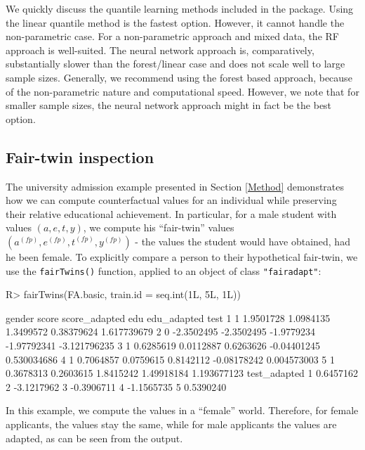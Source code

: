\documentclass[
  notitle]{jss}
\begin{document}
We quickly discuss the quantile learning methods included in the
package. Using the linear quantile method is the fastest option.
However, it cannot handle the non-parametric case. For a non-parametric
approach and mixed data, the RF approach is well-suited. The neural
network approach is, comparatively, substantially slower than the
forest/linear case and does not scale well to large sample sizes.
Generally, we recommend using the forest based approach, because of the
non-parametric nature and computational speed. However, we note that for
smaller sample sizes, the neural network approach might in fact be the
best option.

\hypertarget{fair-twin-inspection}{%
\subsection{Fair-twin inspection}\label{fair-twin-inspection}}

The university admission example presented in Section \ref{Method}
demonstrates how we can compute counterfactual values for an individual
while preserving their relative educational achievement. In particular,
for a male student with values \((a, e, t, y)\), we compute his
``fair-twin'' values
\(( {a}^{(fp)},  {e}^{(fp)},  {t}^{(fp)},  {y}^{(fp)})\) - the values
the student would have obtained, had he been female. To explicitly
compare a person to their hypothetical fair-twin, we use the
\texttt{fairTwins()} function, applied to an object of class
\texttt{"fairadapt"}:

\begin{CodeChunk}
\begin{CodeInput}
R> fairTwins(FA.basic, train.id = seq.int(1L, 5L, 1L))
\end{CodeInput}
\begin{CodeOutput}
  gender      score score_adapted        edu edu_adapted         test
1      1  1.9501728     1.0984135  1.3499572  0.38379624  1.617739679
2      0 -2.3502495    -2.3502495 -1.9779234 -1.97792341 -3.121796235
3      1  0.6285619     0.0112887  0.6263626 -0.04401245  0.530034686
4      1  0.7064857     0.0759615  0.8142112 -0.08178242  0.004573003
5      1  0.3678313     0.2603615  1.8415242  1.49918184  1.193677123
  test_adapted
1    0.6457162
2   -3.1217962
3   -0.3906711
4   -1.1565735
5    0.5390240
\end{CodeOutput}
\end{CodeChunk}

In this example, we compute the values in a ``female'' world. Therefore,
for female applicants, the values stay the same, while for male
applicants the values are adapted, as can be seen from the output.
\end{document}
